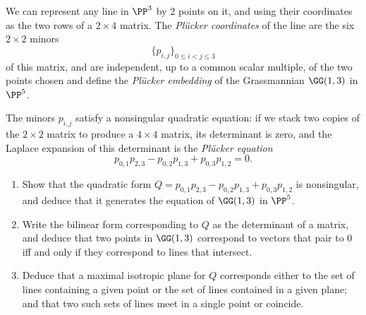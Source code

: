  
\begin{exercise}\label{G13}
We can represent any line in $\PP^3$ by 2 points on it, and using their coordinates as the two rows of a 
$2\times 4$ matrix. The \emph{Pl\"ucker coordinates} of the line are the six $2\times 2$ minors
$$
\{p_{i,j}\}_{0\leq i<j\leq 3}
$$
of this matrix, and are independent, up to a common scalar multiple, of the two points chosen and define the \emph{Pl\"ucker embedding} of the Grassmannian $\GG(1,3)$ in $\PP^5$.

The minors $p_{i,j}$  satisfy a nonsingular quadratic equation: if we stack two copies of the $2\times 2$
matrix to produce a $4\times 4$ matrix, its determinant is zero, and the Laplace expansion of this determinant
is the \emph{Pl\"ucker equation}
$$
p_{0,1}p_{2,3}-p_{0,2}p_{1,3}+p_{0,3}p_{1,2} = 0.
$$

\begin{enumerate}
\item Show that the quadratic form
$
Q = p_{0,1}p_{2,3}-p_{0,2}p_{1,3}+p_{0,3}p_{1,2}
$
is nonsingular, and deduce that it generates the equation of $\GG(1,3)$ in $\PP^5$.
\item
Write the bilinear form corresponding to $Q$ as the determinant of a matrix, and deduce that 
two points in $\GG(1,3)$ correspond to vectors that pair to 0 iff and only if they correspond to lines that intersect.
\item Deduce that a maximal isotropic plane for $Q$ corresponds either to the set of lines containing a given point or the set of lines contained in a given plane; and that two such sets of lines meet in a single point or coincide.
\end{enumerate}
\end{exercise}




